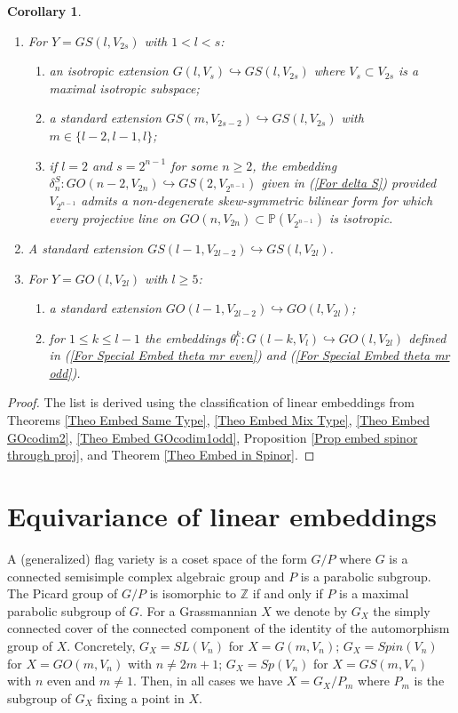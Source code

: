 \documentclass[12pt]{amsart}
\def\PP {{\mathbb P}}     %
\def\ZZ {{\mathbb Z}}     %
\def\hw  {\hookrightarrow}
\newtheorem{coro}[theorem]{Corollary}
\begin{document}
\begin{coro}
\begin{enumerate}
\item[{\rm (c)}] For $Y=GS(l,V_{2s})$ with $1<l<s$:
\begin{enumerate}
\item[{\rm (c.1)}] an isotropic extension $G(l,V_s)\hw GS(l,V_{2s})$ where $V_s\subset V_{2s}$ is a maximal isotropic subspace;
\item[{\rm (c.2)}] a standard extension $GS(m,V_{2s-2})\hw GS(l,V_{2s})$ with $m\in\{l-2,l-1,l\}$;
\item[{\rm (c.3)}] if $l=2$ and $s=2^{n-1}$ for some $n\geq 2$, the embedding $\delta^S_{n}:GO(n-2,V_{2n}) \hookrightarrow GS(2,V_{2^{n-1}})$ given in (\ref{For delta S}) provided $V_{2^{n-1}}$ admits a non-degenerate skew-symmetric bilinear form for which every projective line on $GO(n,V_{2n})\subset \PP(V_{2^{n-1}})$ is isotropic.
\end{enumerate}

\item[{\rm (d)}] A standard extension $GS(l-1,V_{2l-2}) \hw GS(l,V_{2l})$.

\item[{\rm (e)}] For $Y=GO(l,V_{2l})$ with $l\geq 5$:
\begin{enumerate}
\item[{\rm (e.1)}] a standard extension $GO(l-1,V_{2l-2})\hw GO(l,V_{2l})$;
\item[{\rm (e.2)}] for $1\leq k\leq l-1$ the embeddings $\theta^k_l:G(l-k,V_{l})\hw GO(l,V_{2l})$ defined in (\ref{For Special Embed theta mr even}) and (\ref{For Special Embed theta mr odd}).
\end{enumerate}
\end{enumerate}
\end{coro}

\begin{proof}
The list is derived using the classification of linear embeddings from Theorems \ref{Theo Embed Same Type}, \ref{Theo Embed Mix Type}, \ref{Theo Embed GOcodim2}, \ref{Theo Embed GOcodim1odd}, Proposition \ref{Prop embed spinor through proj}, and Theorem \ref{Theo Embed in Spinor}.
\end{proof}


\section{Equivariance of linear embeddings}\label{Sec Equivar}

A (generalized) flag variety is a coset space of the form $G/P$ where $G$ is a connected semisimple complex algebraic group and $P$ is a parabolic subgroup. The Picard group of $G/P$ is isomorphic to $\ZZ$ if and only if $P$ is a maximal parabolic subgroup of $G$. For a Grassmannian $X$ we denote by $G_X$ the simply connected cover of the connected component of the identity of the automorphism group of $X$. Concretely, $G_X= SL(V_n)$ for $X=G(m,V_n)$; $G_X=Spin(V_n)$ for $X=GO(m,V_n)$ with $n\ne 2m+1$; $G_X=Sp(V_n)$ for $X=GS(m,V_n)$ with $n$ even and $m\ne 1$. Then, in all cases we have $X=G_X/P_m$ where $P_m$ is the subgroup of $G_X$ fixing a point in $X$.
\end{document}
